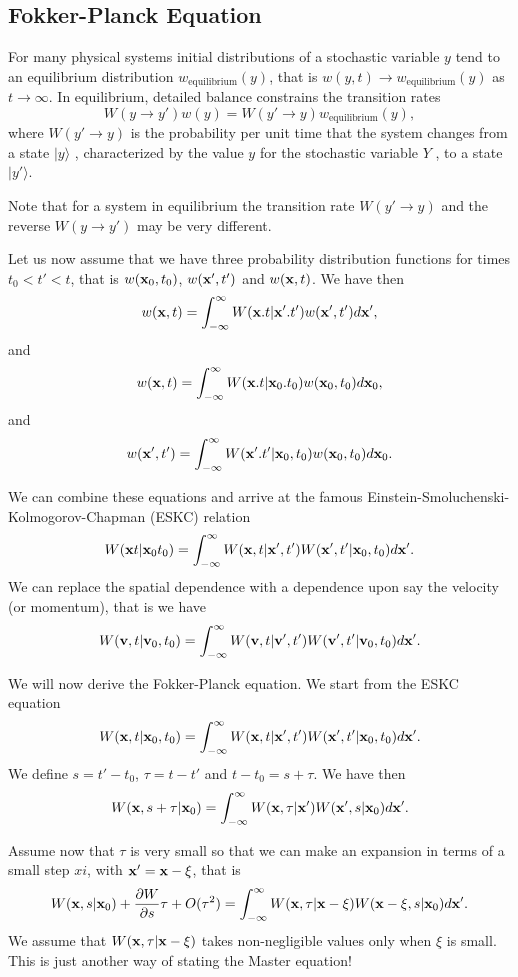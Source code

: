 \subsection{Fokker-Planck Equation}
     For many physical systems initial distributions of a stochastic 
variable $y$ tend to an equilibrium distribution $w_{\mathrm{equilibrium}}(y)$, 
that is $w(y, t)\rightarrow w_{\mathrm{equilibrium}}(y)$ 
as $t\rightarrow\infty$. In
equilibrium, detailed balance constrains the transition rates
\[
     W(y\rightarrow y')w(y ) = W(y'\rightarrow y)w_{\mathrm{equilibrium}}(y),
\]
where $W(y'\rightarrow y)$ 
is the probability per unit time that the system changes
from a state $|y\rangle$ , characterized by the value $y$ 
for the stochastic variable $Y$ , to a state $|y'\rangle$.

Note that for a system in equilibrium the transition rate 
$W(y'\rightarrow y)$ and
the reverse $W(y\rightarrow y')$ may be very different. 


Let us now assume that we have three probability distribution functions for times $t_0 < t' < t$, that is
$w({\bf x}_0,t_0)$, $w({\bf x}',t')$ and $w({\bf x},t)$.
We have then  
\[
   w({\bf x},t)= \int_{-\infty}^{\infty} W({\bf x}.t|{\bf x}'.t')w({\bf x}',t')d{\bf x}',
\]
and
\[
   w({\bf x},t)= \int_{-\infty}^{\infty} W({\bf x}.t|{\bf x}_0.t_0)w({\bf x}_0,t_0)d{\bf x}_0,
\]
and
\[
   w({\bf x}',t')= \int_{-\infty}^{\infty} W({\bf x}'.t'|{\bf x}_0,t_0)w({\bf x}_0,t_0)d{\bf x}_0.
\]

We can combine these equations and arrive at the 
famous Einstein-Smoluchenski-Kolmogorov-Chapman (ESKC) relation
\[
 W({\bf x}t|{\bf x}_0t_0)  = \int_{-\infty}^{\infty} W({\bf x},t|{\bf x}',t')W({\bf x}',t'|{\bf x}_0,t_0)d{\bf x}'.
\]
We can replace the spatial dependence with a dependence upon say the velocity
(or momentum), that is we have
\[
 W({\bf v},t|{\bf v}_0,t_0)  = \int_{-\infty}^{\infty} W({\bf v},t|{\bf v}',t')W({\bf v}',t'|{\bf v}_0,t_0)d{\bf x}'.
\]

We will now derive the Fokker-Planck equation. 
We start from the ESKC equation
\[
 W({\bf x},t|{\bf x}_0,t_0)  = \int_{-\infty}^{\infty} W({\bf x},t|{\bf x}',t')W({\bf x}',t'|{\bf x}_0,t_0)d{\bf x}'.
\]
We define $s=t'-t_0$, $\tau=t-t'$ and $t-t_0=s+\tau$. We have then
\[
 W({\bf x},s+\tau|{\bf x}_0)  = \int_{-\infty}^{\infty} W({\bf x},\tau|{\bf x}')W({\bf x}',s|{\bf x}_0)d{\bf x}'.
\]

Assume now that $\tau$ is very small so that we can make an expansion 
in terms of a small step $xi$, with ${\bf x}'={\bf x}-\xi$, that is
\[
 W({\bf x},s|{\bf x}_0)+\frac{\partial W}{\partial s}\tau +O(\tau^2) = \int_{-\infty}^{\infty} W({\bf x},\tau|{\bf x}-\xi)W({\bf x}-\xi,s|{\bf x}_0)d{\bf x}'.
\]
We assume that $W({\bf x},\tau|{\bf x}-\xi)$ takes non-negligible values only when $\xi$ is small. This is just another way of stating the Master equation!

